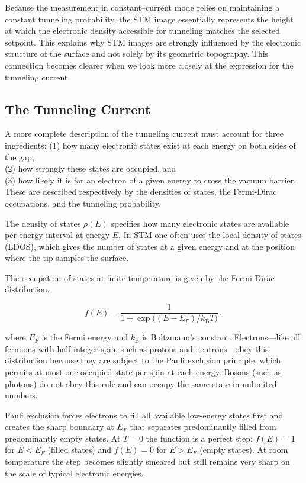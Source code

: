 \documentclass[a4paper]{article}
\begin{document}
Because the measurement in constant–current mode relies on maintaining a constant tunneling probability, the STM image essentially represents the height at which the electronic density accessible for tunneling matches the selected setpoint.
This explains why STM images are strongly influenced by the electronic structure of the surface and not solely by its geometric topography.
This connection becomes clearer when we look more closely at the expression for the tunneling current.

\subsection{The Tunneling Current}

A more complete description of the tunneling current must account for three ingredients:
(1) how many electronic states exist at each energy on both sides of the gap,\\
(2) how strongly these states are occupied, and\\
(3) how likely it is for an electron of a given energy to cross the vacuum barrier.\\
These are described respectively by the densities of states, the Fermi-Dirac occupations, and the tunneling probability.

The density of states $\rho(E)$ specifies how many electronic states are available per energy interval at energy $E$.
In STM one often uses the local density of states (LDOS), which gives the number of states at a given energy and at the position where the tip samples the surface.

The occupation of states at finite temperature is given by the Fermi-Dirac distribution,

\[
  f(E) = \frac{1}{1 + \exp\!\big((E - E_F)/k_\mathrm{B}T\big)} \, ,
\]

where $E_F$ is the Fermi energy and $k_\mathrm{B}$ is Boltzmann’s constant.
Electrons---like all fermions with half-integer spin, such as protons and neutrons---obey this distribution because they are subject to the Pauli exclusion principle, which permits at most one occupied state per spin at each energy.
Bosons (such as photons) do not obey this rule and can occupy the same state in unlimited numbers.

Pauli exclusion forces electrons to fill all available low-energy states first and creates the sharp boundary at $E_F$ that separates predominantly filled from predominantly empty states.
At $T=0$ the function is a perfect step: $f(E)=1$ for $E<E_F$ (filled states) and $f(E)=0$ for $E>E_F$ (empty states).
At room temperature the step becomes slightly smeared but still remains very sharp on the scale of typical electronic energies.
\end{document}
